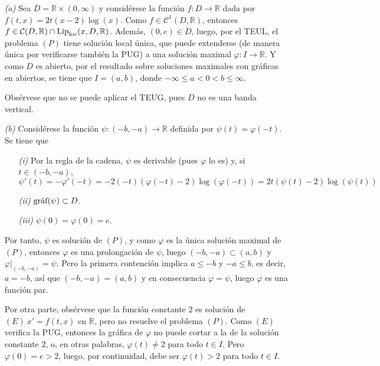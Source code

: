 \documentclass[11pt]{report}
\newcommand{\R}{\mathbb R}
\begin{document}
\begin{itemize}
    \item[\textit{(a)}] Sea $D=\R \times (0,\infty)$ y considérese la función $f \colon D \to \R$ dada por $f(t,x) = 2t(x-2)\log(x)$. Como $f \in \mathcal{C}^1(D,\R)$, entonces $f \in \mathcal{C}(D,\R) \cap \textup{Lip}_{\textup{loc}}(x,D,\R)$. Además, $(0,e) \in \mathring{D}$, luego, por el TEUL, el problema $(P)$ tiene solución local única, que puede extenderse (de manera única por verificarse también la PUG) a una solución maximal $\varphi \colon I \to \R$. Y como $D$ es abierto, por el resultado sobre soluciones maximales con gráficas en abiertos, se tiene que $I=(a,b)$, donde $-\infty\leq a < 0 < b \leq \infty$.

    \vspace{2mm}

    Obsérvese que no se puede aplicar el TEUG, pues $D$ no es una banda vertical.
    \item[\textit{(b)}] Considérese la función $\psi \colon (-b,-a) \to \R$ definida por $\psi(t)= \varphi(-t)$. Se tiene que
    \begin{itemize}
        \item[\textit{(i)}] Por la regla de la cadena, $\psi$ es derivable (pues $\varphi$ lo es) y, si $t \in (-b,-a)$,
        \[\psi'(t)=-\varphi'(-t)=-2(-t)(\varphi(-t)-2)\log(\varphi(-t))=2t(\psi(t)-2)\log(\psi(t))\]
        \item[\textit{(ii)}] $\textup{gráf}(\psi) \subset D$.
        \item[\textit{(iii)}] $\psi(0)=\varphi(0)=e$.
    \end{itemize}
    Por tanto, $\psi$ es solución de $(P)$, y como $\varphi$ es la única solución maximal de $(P)$, entonces $\varphi$ es una prolongación de $\psi$, luego $(-b,-a) \subset (a,b)$ y $\varphi |_{(-b,-a)} = \psi$. Pero la primera contención implica $a \leq -b$ y $-a \leq b$, es decir, $a=-b$, así que $(-b,-a)=(a,b)$ y en consecuencia $\varphi=\psi$, luego $\varphi$ es una función par.

    \vspace{2mm}

    Por otra parte, obsérvese que la función constante $2$ es solución de $(E) \ x'=f(t,x)$ en $\R$, pero no resuelve el problema $(P)$. Como $(E)$ verifica la PUG, entonces la gráfica de $\varphi$ no puede cortar a la de la solución constante $2$, o, en otras palabras, $\varphi(t) \neq 2$ para todo $t \in I$. Pero $\varphi(0)=e>2$, luego, por continuidad, debe ser $\varphi(t)>2$ para todo $t \in I$.


\end{itemize}
\end{document}
